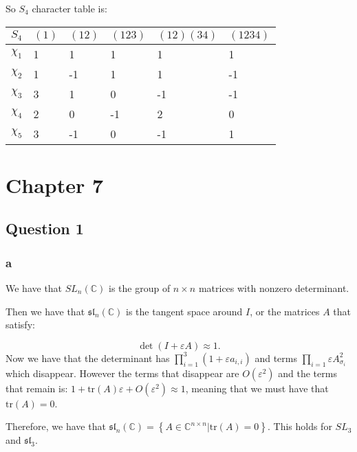 \documentclass[]{article}
\newcommand{\tr}{\text{tr}}
\begin{document}
So $S_4$ character table is:
\begin{table}[h!]
	\centering
	\begin{tabular}{|l|l|l|l|l|l|}
		\hline
		$S_4$    & $(1)$ & $(12)$ & $(123)$ & $(12)(34)$ & $(1234)$ \\ \hline
		$\chi_1$ & 1     & 1      & 1       & 1          & 1        \\ \hline
		$\chi_2$ & 1     & -1     & 1       & 1          & -1       \\ \hline
		$\chi_3$ & 3     & 1      & 0       & -1         & -1       \\ \hline
		$\chi_4$ & 2     & 0      & -1      & 2          & 0        \\ \hline
		$\chi_5$ & 3     & -1     & 0       & -1         & 1        \\ \hline
	\end{tabular}
\end{table}

\section*{Chapter 7}
\subsection*{Question 1}

\subsubsection*{a}
We have that $SL_n(\mathbb{C})$ is the group of $n \times n$ matrices with nonzero determinant. 

Then we have that $\mathfrak{sl}_n(\mathbb{C})$ is the tangent space around $I$, or the matrices $A$ that satisfy:

\begin{equation}
	\det \left(I + \varepsilon A\right) \approx 1.
\end{equation}
Now we have that the determinant has $\prod_{i = 1}^3 ( 1 + \varepsilon a_{i,i})$ and terms $\prod_{i = 1} \varepsilon A_{\sigma_i}^2$ which disappear. However the terms that disappear are $O(\varepsilon^2)$ and the terms that remain is: $1 + \tr(A) \varepsilon + O(\varepsilon^2) \approx 1$, meaning that we must have that $\tr(A) = 0$. 

Therefore, we have that $\mathfrak{sl}_n(\mathbb{C}) = \left\{A \in \mathbb{C}^{n \times n} | \tr(A) = 0\right\}$.
This holds for $SL_3$ and $\mathfrak{sl}_3$. 
\end{document}
